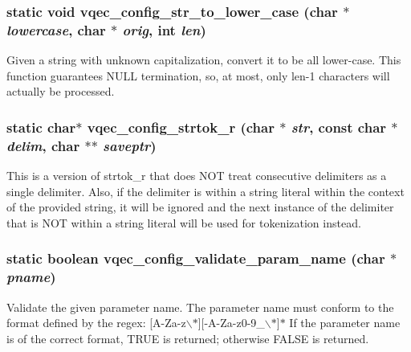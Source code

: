 \subsubsection{\setlength{\rightskip}{0pt plus 5cm}static void vqec\_\-config\_\-str\_\-to\_\-lower\_\-case (char $\ast$ {\em lowercase}, char $\ast$ {\em orig}, int {\em len})\hspace{0.3cm}{\tt  [static]}}\label{vqec__config__parser_8c_90ed84f8cad691655c54d5b9108a64bb}


Given a string with unknown capitalization, convert it to be all lower-case. This function guarantees NULL termination, so, at most, only len-1 characters will actually be processed. 
\subsubsection{\setlength{\rightskip}{0pt plus 5cm}static char$\ast$ vqec\_\-config\_\-strtok\_\-r (char $\ast$ {\em str}, const char $\ast$ {\em delim}, char $\ast$$\ast$ {\em saveptr})\hspace{0.3cm}{\tt  [static]}}\label{vqec__config__parser_8c_f0c2ba5d5b3b9192775bee3afed1eedd}


This is a version of strtok\_\-r that does NOT treat consecutive delimiters as a single delimiter. Also, if the delimiter is within a string literal within the context of the provided string, it will be ignored and the next instance of the delimiter that is NOT within a string literal will be used for tokenization instead. 
\subsubsection{\setlength{\rightskip}{0pt plus 5cm}static boolean vqec\_\-config\_\-validate\_\-param\_\-name (char $\ast$ {\em pname})\hspace{0.3cm}{\tt  [static]}}\label{vqec__config__parser_8c_e4d390b8685b1018511c0b59813dc551}


Validate the given parameter name. The parameter name must conform to the format defined by the regex: [A-Za-z$\backslash$$\ast$][-A-Za-z0-9\_\-$\backslash$$\ast$]$\ast$ If the parameter name is of the correct format, TRUE is returned; otherwise FALSE is returned.

